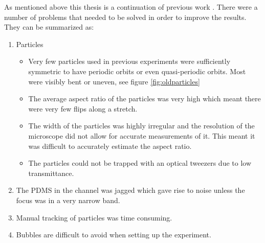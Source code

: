 As mentioned above this thesis is a continuation of previous work \cite{AntonThesis, JonasExperiment, Mishra}. There were a number of problems that needed to be solved in order to improve the results. They can be summarized as:
\begin{enumerate} \label{list:problems}
	\item Particles 
	\begin{itemize}
		\item Very few particles used in previous experiments were sufficiently symmetric to have periodic orbits or even quasi-periodic orbits. Most were visibly bent or uneven, see figure \ref{fig:oldparticles}
		\item The average aspect ratio of the particles was very high which meant there were very few flips along a stretch.
		\item The width of the particles was highly irregular and the resolution of the microscope did not allow for accurate measurements of it. This meant it was difficult to accurately estimate the aspect ratio.
		\item The particles could not be trapped with an optical tweezers due to low transmittance.
	\end{itemize}
	\item The PDMS in the channel was jagged which gave rise to noise unless the focus was in a very narrow band.
	\item Manual tracking of particles was time consuming.
	\item Bubbles are difficult to avoid when setting up the experiment.
\end{enumerate}

